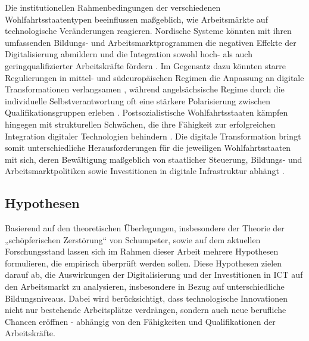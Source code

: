 Die institutionellen Rahmenbedingungen der verschiedenen Wohlfahrtsstaatentypen beeinflussen 
maßgeblich, wie Arbeitsmärkte auf technologische Veränderungen reagieren. Nordische Systeme 
könnten mit ihren umfassenden Bildungs- und Arbeitsmarktprogrammen die negativen Effekte der 
Digitalisierung abmildern und die Integration sowohl hoch- als auch geringqualifizierter 
Arbeitskräfte fördern \parencite[S. 27–28]{espingandersen1990thethree}. Im Gegensatz dazu könnten 
starre Regulierungen in mittel- und südeuropäischen Regimen die Anpassung an digitale 
Transformationen verlangsamen \parencite[S. 19–21]{ferrera1996thesouthern}, während 
angelsächsische Regime durch die individuelle Selbstverantwortung oft eine stärkere Polarisierung 
zwischen Qualifikationsgruppen erleben \parencite[S. 3–5]{hall2001varieties}. Postsozialistische 
Wohlfahrtsstaaten kämpfen hingegen mit strukturellen Schwächen, die ihre Fähigkeit zur 
erfolgreichen Integration digitaler Technologien behindern 
\parencite[vgl.][S. 104–105]{cerami2006socialpolicy}. Die digitale Transformation bringt somit 
unterschiedliche Herausforderungen für die jeweiligen Wohlfahrtsstaaten mit sich, deren 
Bewältigung maßgeblich von staatlicher Steuerung, Bildungs- und Arbeitsmarktpolitiken sowie 
Investitionen in digitale Infrastruktur abhängt \parencite[S. 22–23]{oecd2020digital}.


\subsection{Hypothesen}

Basierend auf den theoretischen Überlegungen, insbesondere der Theorie der „schöpferischen 
Zerstörung“ von Schumpeter, sowie auf dem aktuellen Forschungsstand lassen sich im Rahmen dieser 
Arbeit mehrere Hypothesen formulieren, die empirisch überprüft werden sollen. Diese Hypothesen 
zielen darauf ab, die Auswirkungen der Digitalisierung und der Investitionen in \ac{ICT} auf den 
Arbeitsmarkt zu analysieren, insbesondere in Bezug auf unterschiedliche Bildungsniveaus. Dabei 
wird berücksichtigt, dass technologische Innovationen nicht nur bestehende Arbeitsplätze 
verdrängen, sondern auch neue berufliche Chancen eröffnen - abhängig von den Fähigkeiten und 
Qualifikationen der Arbeitskräfte.


